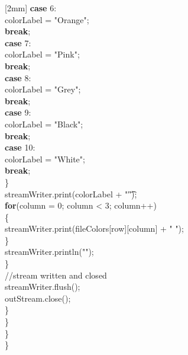 \documentclass[12pt]{article}
\begin{document}
\begin{flushleft}
{						[2mm]
\qquad \qquad \qquad \qquad \qquad \qquad		\textbf{case} 6:\\
\qquad \qquad \qquad \qquad \qquad \qquad	\qquad	colorLabel = "Orange";\\
\qquad \qquad \qquad \qquad \qquad \qquad		\textbf{break};\\
						[2mm]
\qquad \qquad \qquad \qquad \qquad \qquad		\textbf{case} 7:\\
\qquad \qquad \qquad \qquad \qquad \qquad	\qquad	colorLabel = "Pink";\\
\qquad \qquad \qquad \qquad \qquad \qquad		\textbf{break};\\
						[2mm]
\qquad \qquad \qquad \qquad \qquad \qquad		\textbf{case} 8:\\
\qquad \qquad \qquad \qquad \qquad \qquad	\qquad	colorLabel = "Grey";\\
\qquad \qquad \qquad \qquad \qquad \qquad		\textbf{break};\\
						[2mm]
\qquad \qquad \qquad \qquad \qquad \qquad		\textbf{case} 9:\\
\qquad \qquad \qquad \qquad \qquad \qquad	\qquad	colorLabel = "Black";\\
\qquad \qquad \qquad \qquad \qquad \qquad		\textbf{break};\\
						[2mm]
\qquad \qquad \qquad \qquad \qquad \qquad		\textbf{case} 10:\\
\qquad \qquad \qquad \qquad \qquad \qquad	\qquad	colorLabel = "White";\\
\qquad \qquad \qquad \qquad \qquad \qquad		\textbf{break};\\
\qquad \qquad \qquad \qquad \qquad	\}\\
					[2mm]
\qquad \qquad \qquad \qquad \qquad		streamWriter.print(colorLabel + "\t");\\
					[2mm]
\qquad \qquad \qquad \qquad \qquad	\textbf{for}(column = 0; column < 3; column++)\\
\qquad \qquad \qquad \qquad \qquad					\{\\
\qquad \qquad	\qquad \qquad \qquad \quad	 					streamWriter.print(fileColors[row][column] + " ");\\
\qquad \qquad	\qquad \qquad \qquad				\}\\
\qquad \qquad \qquad	\qquad	\qquad			streamWriter.println("");\\
\qquad \qquad \qquad	\qquad 			\}\\  
				[2mm]
\qquad \qquad \qquad \qquad					//stream written and closed\\
\qquad \qquad \qquad	\qquad			streamWriter.flush();\\
\qquad \qquad \qquad	\qquad 			outStream.close();\\
\qquad \qquad \qquad	 		\}\\                                                             
 \qquad \qquad		\}\\                                                              
\qquad	\}\\ 
	
\}\\



 




}


\end{flushleft}
\end{document}
